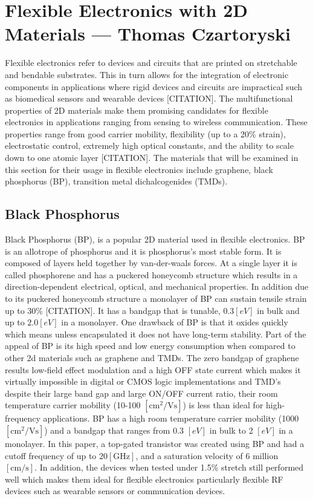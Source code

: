 \documentclass[conference]{IEEEtran}
\begin{document}
\section{Flexible Electronics with 2D Materials — Thomas Czartoryski}

Flexible electronics refer to devices and circuits that are printed on stretchable and bendable substrates. This in turn allows for the integration of electronic components in applications where rigid devices and circuits are impractical such as biomedical sensors and wearable devices [CITATION]. The multifunctional properties of 2D materials make them promising candidates for flexible electronics in applications ranging from sensing to wireless communication. These properties range from good carrier mobility, flexibility (up to a 20\% strain), electrostatic control, extremely high optical constants, and the ability to scale down to one atomic layer [CITATION]. The materials that will be examined in this section for their usage in flexible electronics include graphene, black phosphorus (BP), transition metal dichalcogenides (TMDs).

\subsection{Black Phosphorus}

Black Phosphorus (BP), is a popular 2D material used in flexible electronics. BP is an allotrope of phosphorus and it is phosphorus's most stable form. It is composed of layers held together by van-der-waals forces. At a single layer it is called phosphorene and has a puckered honeycomb structure which results in a direction-dependent electrical, optical, and mechanical properties. In addition due to its puckered honeycomb structure a monolayer of BP can sustain tensile strain up to 30\% [CITATION]. It has a bandgap that is tunable, 0.3$[\si{eV}]$ in bulk and up to $2.0[\si{eV}]$ in a monolayer. One drawback of BP is that it oxides quickly which means unless encapsulated it does not have long-term stability. Part of the appeal of BP is its high speed and low energy consumption when compared to other 2d materials such as graphene and TMDs. The zero bandgap of graphene results low-field effect modulation and a high OFF state current which makes it virtually impossible in digital or CMOS logic implementations and TMD’s despite their large band gap and large ON/OFF current ratio, their room temperature carrier mobility (10-100 $[\si{\centi\meter\squared\per\volt\second}]$)  is less than ideal for high-frequency applications. BP has a high room temperature carrier mobility (1000 $[\si{\centi\meter\squared\per\volt\second}]$) and a bandgap that ranges from 0.3 $[\si{eV}]$ in bulk to 2 $[\si{eV}]$ in a monolayer. In this paper, a top-gated transistor was created using BP and had a cutoff frequency of up to $20 [\si{\giga\hertz}]$, and a saturation velocity of 6 million $[\si{\centi\meter\per\second}]$. In addition, the devices when tested under 1.5\% stretch still performed well which makes them ideal for flexible electronics particularly flexible RF devices such as wearable sensors or communication devices.
\end{document}
